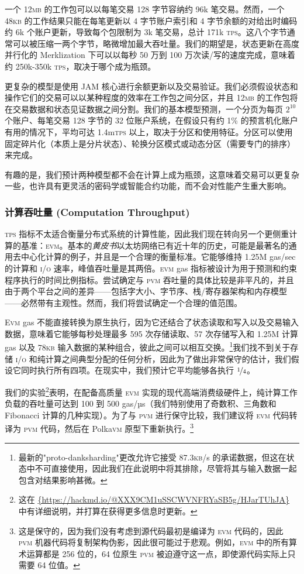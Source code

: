 一个 12\textsc{mb} 的工作包可以以每笔交易 128 字节容纳约 96k 笔交易。然而，一个 48\textsc{kb} 的工作结果只能在每笔更新以 4 字节账户索引和 4 字节余额的对给出时编码约 6k 个账户更新，导致每个包限制为 3k 笔交易，总计 171k \textsc{tps}。这八个字节通常可以被压缩一两个字节，略微增加最大吞吐量。我们的期望是，状态更新在高度并行化的 Merklization 下可以以每秒 50 万到 100 万次读/写的速度完成，意味着约 250k-350k \textsc{tps}，取决于哪个成为瓶颈。

更复杂的模型是使用 JAM 核心进行余额更新以及交易验证。我们必须假设状态和操作它们的交易可以以某种程度的效率在工作包之间分区，并且 12\textsc{mb} 的工作包将在交易数据和状态见证数据之间分割。我们的基本模型预测，一个分页为每页 $2^{10}$ 个账户、每笔交易 128 字节的 32 位账户系统，在假设只有约 1\% 的预言机化账户有用的情况下，平均可达 1.4m\textsc{tps} 以上，取决于分区和使用特征。分区可以使用固定碎片化（本质上是分片状态）、轮换分区模式或动态分区（需要专门的排序）来完成。

有趣的是，我们预计两种模型都不会在计算上成为瓶颈，这意味着交易可以更复杂一些，也许具有更灵活的密码学或智能合约功能，而不会对性能产生重大影响。

\subsubsection{计算吞吐量 (Computation Throughput)}
\textsc{tps} 指标不太适合衡量分布式系统的计算性能，因此我们现在转向另一个更侧重计算的基准：\textsc{evm}。基本的\emph{黄皮书}以太坊网络已有近十年的历史，可能是最著名的通用去中心化计算的例子，并且是一个合理的衡量标准。它能够维持 1.25M gas/sec 的计算和 \textsc{i/o} 速率，峰值吞吐量是其两倍。\textsc{evm} gas 指标被设计为用于预测和约束程序执行的时间比例指标。尝试确定与 \textsc{pvm} 吞吐量的具体比较是非平凡的，并且由于两个平台之间的差异——包括字大小、字节序、栈/寄存器架构和内存模型——必然带有主观性。然而，我们将尝试确定一个合理的值范围。

\textsc{Evm} gas 不能直接转换为原生执行，因为它还结合了状态读取和写入以及交易输入数据，意味着它能够每秒处理最多 595 次存储读取、57 次存储写入和 1.25M 计算 gas 以及 78\textsc{kb} 输入数据的某种组合，彼此之间可以相互交换。\footnote{最新的"proto-danksharding"更改允许它接受 87.3\textsc{kb}/s 的承诺数据，但这在状态中不可直接使用，因此我们在此说明中将其排除，尽管将其与输入数据一起包含对结果影响甚微。}我们找不到关于存储 \textsc{i/o} 和纯计算之间典型分配的任何分析，因此为了做出非常保守的估计，我们假设它同时执行所有四项。在现实中，我们预计它平均能够各执行 $\nicefrac{1}{4}$。

我们的实验\footnote{这在 \url{{https://hackmd.io/@XXX9CM1uSSCWVNFRYaSB5g/HJarTUhJA}} 中有详细说明，并打算在获得更多信息时更新。}表明，在配备高质量 \textsc{evm} 实现的现代高端消费级硬件上，纯计算工作负载的吞吐量可达到 100 到 500 gas/µs（我们特别使用了奇数积、三角数和 Fibonacci 计算的几种实现）。为了与 \textsc{pvm} 进行保守比较，我们建议将 \textsc{evm} 代码转译为 \textsc{pvm} 代码，然后在 Polka\textsc{vm} 原型下重新执行。\footnote{这是保守的，因为我们没有考虑到源代码最初是编译为 \textsc{evm} 代码的，因此 \textsc{pvm} 机器代码将复制架构伪影，因此很可能过于悲观。例如，\textsc{evm} 中的所有算术运算都是 256 位的，64 位原生 \textsc{pvm} 被迫遵守这一点，即使源代码实际上只需要 64 位值。}

